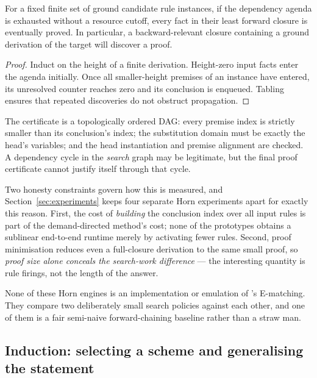 \begin{proposition}
For a fixed finite set of ground candidate rule instances, if the dependency
agenda is exhausted without a resource cutoff, every fact in their least forward
closure is eventually proved. In particular, a backward-relevant closure
containing a ground derivation of the target will discover a proof.
\end{proposition}
\begin{proof}
Induct on the height of a finite derivation. Height-zero input facts enter the
agenda initially. Once all smaller-height premises of an instance have entered,
its unresolved counter reaches zero and its conclusion is enqueued. Tabling
ensures that repeated discoveries do not obstruct propagation.
\end{proof}

The certificate is a topologically ordered DAG: every premise index is strictly
smaller than its conclusion's index; the substitution domain must be exactly the
head's variables; and the head instantiation and premise alignment are checked.
A dependency cycle in the \emph{search} graph may be legitimate, but the final
proof certificate cannot justify itself through that cycle.

Two honesty constraints govern how this is measured, and
Section~\ref{sec:experiments} keeps four separate Horn experiments apart for
exactly this reason. First, the cost of \emph{building} the conclusion index
over all input rules is part of the demand-directed method's cost; none of the
prototypes obtains a sublinear end-to-end runtime merely by activating fewer
rules. Second, proof minimisation reduces even a full-closure derivation to the
same small proof, so \emph{proof size alone conceals the search-work
difference} --- the interesting quantity is rule firings, not the length of the
answer.

\begin{remark}
None of these Horn engines is an implementation or emulation of \grind{}'s
E-matching. They compare two deliberately small search policies against each
other, and one of them is a fair semi-naive forward-chaining baseline rather
than a straw man.
\end{remark}

\subsection{Induction: selecting a scheme and generalising the statement}

